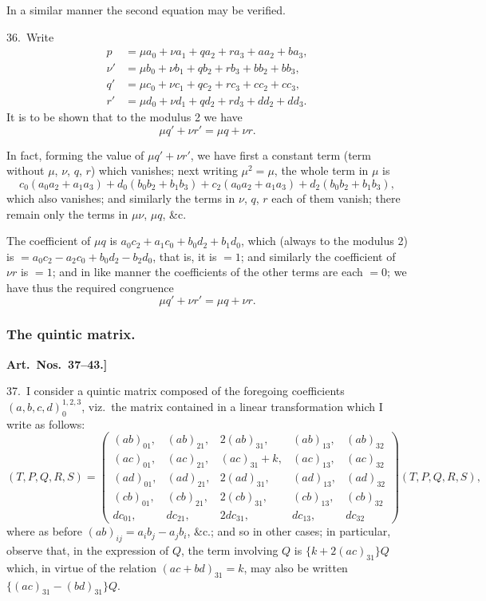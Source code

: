 \documentclass[11pt,a4paper]{book}
\begin{document}
In a similar manner the second equation may be verified.

\medskip

36.\ Write
\begin{align*}
p &= \mu a_0 + \nu a_1 + qa_2 + ra_3 + aa_2 + ba_3,\\
\nu' &= \mu b_0 + \nu b_1 + qb_2 + rb_3 + bb_2 + bb_3,\\
q' &= \mu c_0 + \nu c_1 + qc_2 + rc_3 + cc_2 + cc_3,\\
r' &= \mu d_0 + \nu d_1 + qd_2 + rd_3 + dd_2 + dd_3.
\end{align*}
It is to be shown that to the modulus 2 we have
\[
\mu q' + \nu r' = \mu q + \nu r.
\]

In fact, forming the value of $\mu q' + \nu r'$, we have first a constant term (term without $\mu$, $\nu$, $q$, $r$) which vanishes; next writing $\mu^2 = \mu$, the whole term in $\mu$ is
\[
c_0(a_0a_2 + a_1a_3) + d_0(b_0b_2 + b_1b_3) + c_2(a_0a_2 + a_1a_3) + d_2(b_0b_2 + b_1b_3),
\]
which also vanishes; and similarly the terms in $\nu$, $q$, $r$ each of them vanish; there remain only the terms in $\mu\nu$, $\mu q$, \&c.

The coefficient of $\mu q$ is $a_0c_2 + a_1c_0 + b_0d_2 + b_1d_0$, which (always to the modulus 2) is $= a_0c_2 - a_2c_0 + b_0d_2 - b_2d_0$, that is, it is $= 1$; and similarly the coefficient of $\nu r$ is $= 1$; and in like manner the coefficients of the other terms are each $= 0$; we have thus the required congruence
\[
\mu q' + \nu r' = \mu q + \nu r.
\]

\subsubsection*{The quintic matrix.}

\textbf{Art.~Nos.~37--43.]
}

37.\ I consider a quintic matrix composed of the foregoing coefficients $(a, b, c, d)_0^{1, 2, 3}$, viz.\ the matrix contained in a linear transformation which I write as follows:
\[
(T, P, Q, R, S) =
\begin{pmatrix}
(ab)_{01}, & (ab)_{21}, & 2(ab)_{31}, & (ab)_{13}, & (ab)_{32}\\
(ac)_{01}, & (ac)_{21}, & (ac)_{31} + k, & (ac)_{13}, & (ac)_{32}\\
(ad)_{01}, & (ad)_{21}, & 2(ad)_{31}, & (ad)_{13}, & (ad)_{32}\\
(cb)_{01}, & (cb)_{21}, & 2(cb)_{31}, & (cb)_{13}, & (cb)_{32}\\
dc_{01}, & dc_{21}, & 2dc_{31}, & dc_{13}, & dc_{32}
\end{pmatrix}
(T, P, Q, R, S),
\]
where as before $(ab)_{ij} = a_ib_j - a_jb_i$, \&c.; and so in other cases; in particular, observe that, in the expression of $Q$, the term involving $Q$ is $\{k + 2(ac)_{31}\}Q$ which, in virtue of the relation $(ac + bd)_{31} = k$, may also be written $\{(ac)_{31} - (bd)_{31}\}Q$.
\end{document}
